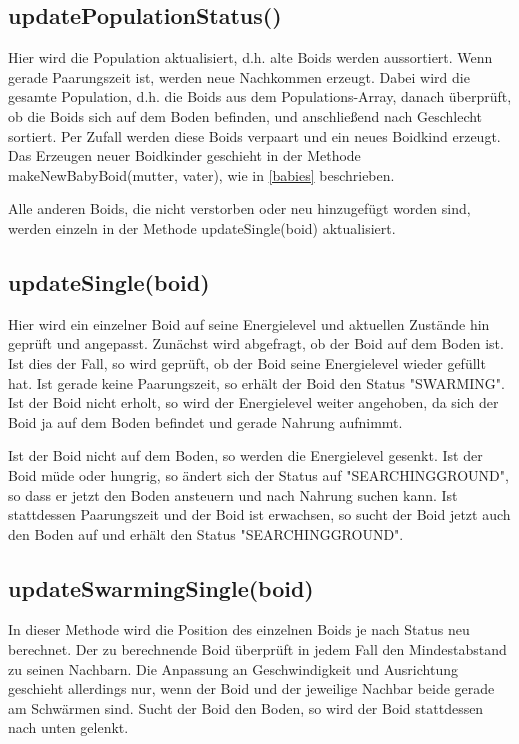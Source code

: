 \documentclass[draft=false
              ,paper=a4
              ,twoside=false
              ,fontsize=11pt
              ,headsepline
              ,BCOR10mm
              ,DIV11
              ,bibtotoc
              ,liststotoc
              ]{scrbook}
\begin{document}
\subsection{updatePopulationStatus()}
 Hier wird die Population aktualisiert, d.h. alte Boids werden aussortiert. Wenn gerade Paarungszeit ist, werden neue Nachkommen erzeugt. Dabei wird die gesamte Population, d.h. die Boids aus dem Populations-Array, danach überprüft, ob die Boids sich auf dem Boden befinden, und anschließend nach Geschlecht sortiert. Per Zufall werden diese Boids verpaart und ein neues Boidkind erzeugt. Das Erzeugen neuer Boidkinder geschieht in der Methode makeNewBabyBoid(mutter, vater), wie in \ref{babies} beschrieben.

Alle anderen Boids, die nicht verstorben oder neu hinzugefügt worden sind, werden einzeln in der Methode updateSingle(boid) aktualisiert.

\subsection{updateSingle(boid)}
 Hier wird ein einzelner Boid auf seine Energielevel und aktuellen Zustände hin geprüft und angepasst. Zunächst wird abgefragt, ob der Boid auf dem Boden ist. Ist dies der Fall, so wird geprüft, ob der Boid seine Energielevel wieder gefüllt hat. Ist gerade keine Paarungszeit, so erhält der Boid den Status "{}SWARMING"{}. Ist der Boid nicht erholt, so wird der Energielevel weiter angehoben, da sich der Boid ja auf dem Boden befindet und gerade Nahrung aufnimmt.

Ist der Boid nicht auf dem Boden, so werden die Energielevel gesenkt. Ist der Boid müde oder hungrig, so ändert sich der Status auf "{}SEARCHINGGROUND"{}, so dass er jetzt den Boden ansteuern und nach Nahrung suchen kann.
Ist stattdessen Paarungszeit und der Boid ist erwachsen, so sucht der Boid jetzt auch den Boden auf und erhält den Status "{}SEARCHINGGROUND"{}.

\subsection{updateSwarmingSingle(boid)}\label{swarmmethod}
In dieser Methode wird die Position des einzelnen Boids je nach Status neu berechnet. Der zu berechnende Boid überprüft in jedem Fall den Mindestabstand zu seinen Nachbarn. Die Anpassung an Geschwindigkeit und Ausrichtung geschieht allerdings nur, wenn der Boid und der jeweilige Nachbar beide gerade am Schwärmen sind. Sucht der Boid den Boden, so wird der Boid stattdessen nach unten gelenkt.
\end{document}
